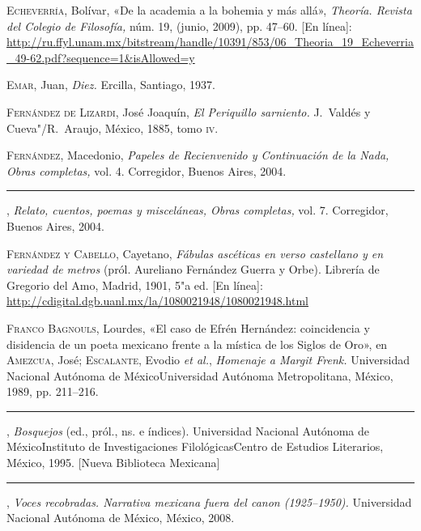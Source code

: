 \documentclass[14pt,twoside,final]{extbook} %
\begin{document}
\textsc{Echeverría}, Bolívar, «De la academia a la bohemia y más allá», \emph{Theoría. Revista del Colegio de Filosofía,} núm. 19, (junio, 2009), pp. 47--60. [En línea]: \url{http://ru.ffyl.unam.mx/bitstream/handle/10391/853/06_Theoria_19_Echeverria_49-62.pdf?sequence=1&isAllowed=y}\label{bib:echeverria2009}

\textsc{Emar}, Juan, \emph{Diez.} Ercilla, Santiago, 1937.\label{bib:emar1937}

\textsc{Fernández de Lizardi}, José Joaquín, \emph{El Periquillo sarniento.} J.~Valdés y Cueva"/R.~Araujo, México, 1885, tomo \textsc{iv}.\label{bib:fernandezlizardi1885}

\textsc{Fernández}, Macedonio, \emph{Papeles de Recienvenido y Continuación de la Nada, Obras completas,} vol. 4. Corregidor, Buenos Aires, 2004.\label{bib:fernandez2004a}

\rule{1cm}{0.4pt}, \emph{Relato, cuentos, poemas y misceláneas, Obras completas,} vol. 7. Corregidor, Buenos Aires, 2004.\label{bib:fernandez2004b}

\textsc{Fernández y Cabello}, Cayetano, \emph{Fábulas ascéticas en verso castellano y en variedad de metros} (pról. Aureliano Fernández Guerra y Orbe). Librería de Gregorio del Amo, Madrid, 1901, 5"a ed. [En línea]: \url{http://cdigital.dgb.uanl.mx/la/1080021948/1080021948.html}\label{bib:fcabello1901}

\textsc{Franco Bagnouls}, Lourdes, «El caso de Efrén Hernández: coincidencia y disidencia de un poeta mexicano frente a la mística de los Siglos de Oro», en \textsc{Amezcua}, José; \textsc{Escalante}, Evodio \emph{et al.}, \emph{Homenaje a Margit Frenk.} Universidad Nacional Autónoma de México Universidad Autónoma Metropolitana, México, 1989, pp. 211--216.\label{bib:franco1989}

\rule{1cm}{0.4pt}, \emph{Bosquejos} (ed., pról., ns. e índices). Universidad Nacional Autónoma de México Instituto de Investigaciones Filológicas Centro de Estudios Literarios, México, 1995. [Nueva Biblioteca Mexicana]\label{bib:franco1995}

\rule{1cm}{0.4pt}, \emph{Voces recobradas. Narrativa mexicana fuera del canon (1925--1950).} Universidad Nacional Autónoma de México, México, 2008.\label{bib:franco2008}
\end{document}

